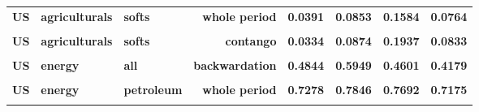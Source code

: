 \documentclass[
  authoryear,
  preprint,
  3p]{elsarticle}
\begin{document}
\begin{longtable}[t]{>{}l>{}l>{}l>{}r>{}r>{}r>{}r>{}r}
\addlinespace
\textbf{US} & \textbf{agriculturals} & \textbf{softs} & \textbf{whole period} & \textcolor[HTML]{4285f4}{\textbf{0.0391}} & \textcolor[HTML]{4285f4}{\textbf{0.0853}} & \textcolor[HTML]{4285f4}{\textbf{0.1584}} & \textcolor[HTML]{4285f4}{\textbf{0.0764}}\\
\textbf{\cellcolor{gray!10}{US}} & \textbf{\cellcolor{gray!10}{agriculturals}} & \textbf{\cellcolor{gray!10}{softs}} & \textbf{\cellcolor{gray!10}{backwardation}} & \textcolor[HTML]{4285f4}{\textbf{\cellcolor{gray!10}{0.0437}}} & \textcolor[HTML]{4285f4}{\textbf{\cellcolor{gray!10}{0.0845}}} & \textcolor[HTML]{4285f4}{\textbf{\cellcolor{gray!10}{0.1210}}} & \textcolor[HTML]{4285f4}{\textbf{\cellcolor{gray!10}{0.0685}}}\\
\textbf{US} & \textbf{agriculturals} & \textbf{softs} & \textbf{contango} & \textcolor[HTML]{4285f4}{\textbf{0.0334}} & \textcolor[HTML]{4285f4}{\textbf{0.0874}} & \textcolor[HTML]{4285f4}{\textbf{0.1937}} & \textcolor[HTML]{4285f4}{\textbf{0.0833}}\\
\textbf{\cellcolor{gray!10}{US}} & \textbf{\cellcolor{gray!10}{energy}} & \textbf{\cellcolor{gray!10}{all}} & \textbf{\cellcolor{gray!10}{whole period}} & \textcolor[HTML]{4285f4}{\textbf{\cellcolor{gray!10}{0.4908}}} & \textcolor[HTML]{4285f4}{\textbf{\cellcolor{gray!10}{0.5892}}} & \textcolor[HTML]{4285f4}{\textbf{\cellcolor{gray!10}{0.4687}}} & \textcolor[HTML]{4285f4}{\textbf{\cellcolor{gray!10}{0.4203}}}\\
\textbf{US} & \textbf{energy} & \textbf{all} & \textbf{backwardation} & \textcolor[HTML]{4285f4}{\textbf{0.4844}} & \textcolor[HTML]{4285f4}{\textbf{0.5949}} & \textcolor[HTML]{4285f4}{\textbf{0.4601}} & \textcolor[HTML]{4285f4}{\textbf{0.4179}}\\
\addlinespace
\textbf{\cellcolor{gray!10}{US}} & \textbf{\cellcolor{gray!10}{energy}} & \textbf{\cellcolor{gray!10}{all}} & \textbf{\cellcolor{gray!10}{contango}} & \textcolor[HTML]{4285f4}{\textbf{\cellcolor{gray!10}{0.4957}}} & \textcolor[HTML]{4285f4}{\textbf{\cellcolor{gray!10}{0.5869}}} & \textcolor[HTML]{4285f4}{\textbf{\cellcolor{gray!10}{0.4779}}} & \textcolor[HTML]{4285f4}{\textbf{\cellcolor{gray!10}{0.4210}}}\\
\textbf{US} & \textbf{energy} & \textbf{petroleum} & \textbf{whole period} & \textcolor[HTML]{4285f4}{\textbf{0.7278}} & \textcolor[HTML]{4285f4}{\textbf{0.7846}} & \textcolor[HTML]{4285f4}{\textbf{0.7692}} & \textcolor[HTML]{4285f4}{\textbf{0.7175}}\\
\textbf{\cellcolor{gray!10}{US}} & \textbf{\cellcolor{gray!10}{energy}} & \textbf{\cellcolor{gray!10}{petroleum}} & \textbf{\cellcolor{gray!10}{backwardation}} & \textcolor[HTML]{4285f4}{\textbf{\cellcolor{gray!10}{0.6962}}} & \textcolor[HTML]{4285f4}{\textbf{\cellcolor{gray!10}{0.7854}}} & \textcolor[HTML]{4285f4}{\textbf{\cellcolor{gray!10}{0.7727}}} & \textcolor[HTML]{4285f4}{\textbf{\cellcolor{gray!10}{0.7282}}}\\

\end{longtable}
\end{document}
